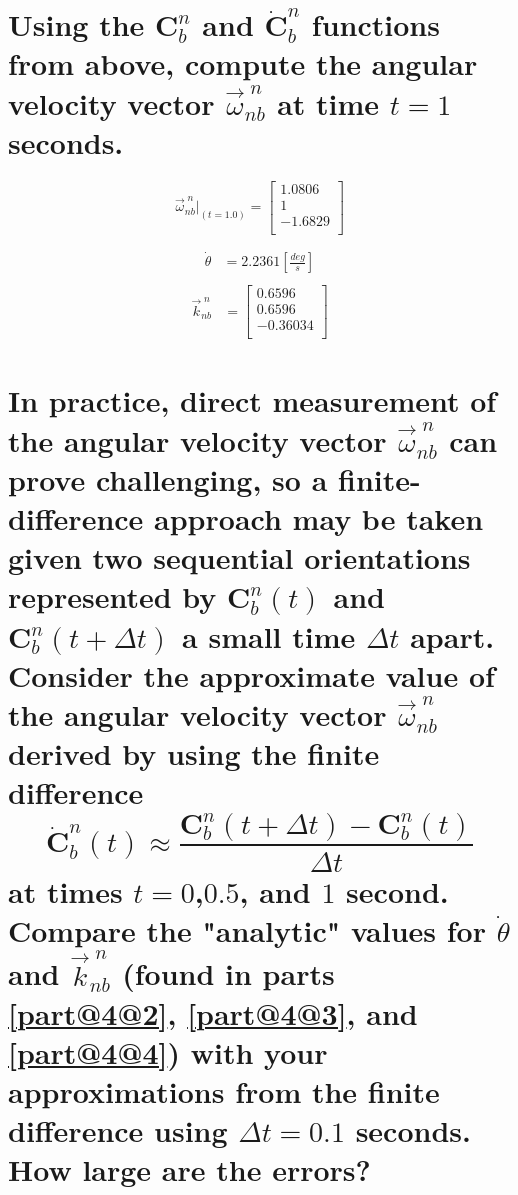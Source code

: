 \documentclass[12pt,letterpaper, onecolumn]{exam}
\begin{document}
\begin{questions}
\begin{parts}
        \part{Using the $\mathbf{C}^n_b$ and $\dot{\mathbf{C}}^n_b$ functions from above, compute the angular velocity vector $\vec{\omega}^{\;n}_{nb}$ at time $t = 1$ seconds.}
        \[\vec{\omega}^{\;n}_{nb}\vert_{(t = 1.0)}  =
            \begin{bmatrix}
                1.0806  \\
                1       \\
                -1.6829 \\
            \end{bmatrix} \]
        \begin{subparts}
            \begin{equation}
                \begin{split}
                    \dot{\theta} & = 2.2361\left[\frac{deg}{s}\right] \\
                \end{split}
            \end{equation}
            \begin{equation}
                \begin{split}
                    \vec{k}^{\;n}_{nb} & =
                    \begin{bmatrix}
                        0.6596   \\
                        0.6596   \\
                        -0.36034 \\
                    \end{bmatrix}
                \end{split}
            \end{equation}
        \end{subparts}

        \part{In practice, direct measurement of the angular velocity vector $\vec{\omega}^{\;n}_{nb}$ can prove challenging, so a finite-difference approach may be taken given two sequential orientations represented by $\mathbf{C}^n_b(t)$ and $\mathbf{C}^n_b(t + \Delta t)$ a small time $\Delta t$ apart. Consider the approximate value of the angular velocity vector $\vec{\omega}^{\;n}_{nb}$ derived by using the finite difference
            \[\dot{\mathbf{C}}^n_b(t) \approx \frac{\mathbf{C}^n_b(t + \Delta t) - \mathbf{C}^n_b(t)}{\Delta t} \]
            at times $t = 0$,$0.5$, and $1$ second. Compare the "analytic" values for $\dot{\theta}$ and $\vec{k}^{\;n}_{nb}$ (found in parts \ref{part@4@2}, \ref{part@4@3}, and \ref{part@4@4}) with your approximations from the finite difference using $\Delta t = 0.1$ seconds. How large are the errors?}


\end{parts}
\end{questions}
\end{document}
